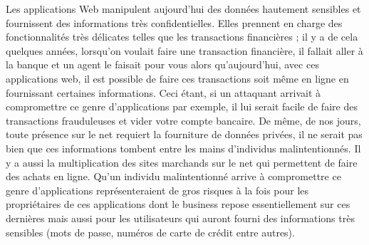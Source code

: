 Les applications Web manipulent aujourd'hui des données hautement sensibles et fournissent des informations très confidentielles. Elles prennent en charge des fonctionnalités très délicates telles que les transactions financières ; il y a de cela quelques années, lorsqu’on voulait faire une transaction financière, il fallait aller à la banque et un agent le faisait pour vous alors qu’aujourd’hui, avec ces applications web, il est possible de faire ces transactions soit même en ligne en fournissant certaines informations. Ceci étant, si un attaquant arrivait à compromettre ce genre d’applications par exemple, il lui serait facile de faire des transactions frauduleuses et vider votre compte bancaire. De même, de nos jours, toute présence sur le net requiert la fourniture de données privées, il ne serait pas bien que ces informations tombent entre les mains d’individus malintentionnés. Il y a aussi la multiplication des sites marchands sur le net qui permettent de faire des achats en ligne. Qu’un individu malintentionné arrive à compromettre ce genre d’applications représenteraient de gros risques à la fois pour les propriétaires de ces applications dont le business repose essentiellement sur ces dernières mais aussi pour les utilisateurs qui auront fourni des informations très sensibles (mots de passe, numéros de carte de crédit entre autres). \\

